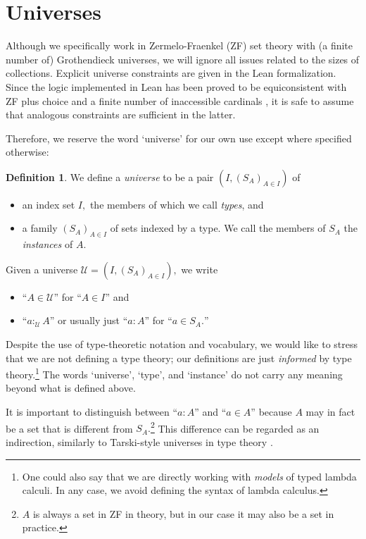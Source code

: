 \documentclass[a4paper]{article}
\theoremstyle{definition}
\newtheorem{definition}{Definition}[section]
\theoremstyle{remark}
\newcommand{\defn}{\emph}
\newcommand{\U}{\mathcal{U}}
\begin{document}
\section{Universes}
\label{sec:universes}

Although we specifically work in Zermelo-Fraenkel (ZF) set theory with (a finite number of)
Grothendieck universes, we will ignore all issues related to the sizes of collections.
Explicit universe constraints are given in the Lean formalization. Since the logic
implemented in Lean has been proved to be equiconsistent with ZF plus choice and a finite
number of inaccessible cardinals \cite{lean-type-theory}, it is safe to assume that analogous
constraints are sufficient in the latter.

Therefore, we reserve the word `universe' for our own use except where specified otherwise:

\begin{definition}
  We define a \defn{universe} to be a pair $(I, (S_A)_{A \in I})$ of
  \begin{itemize}
    \item an index set $I,$ the members of which we call \defn{types}, and
    \item a family $(S_A)_{A \in I}$ of sets indexed by a type. We call the members of $S_A$ the
    \defn{instances} of $A.$
  \end{itemize}
\end{definition}

Given a universe $\U = (I, (S_A)_{A \in I}),$ we write
\begin{itemize}
  \item ``$A \in \U$'' for ``$A \in I$'' and
  \item ``$a :_\U A$'' or usually just ``$a : A$'' for ``$a \in S_A.$''
\end{itemize}

Despite the use of type-theoretic notation and vocabulary, we would like to stress that we are not
defining a type theory; our definitions are just \emph{informed} by type theory.\footnote{One
could also say that we are directly working with \emph{models} of typed lambda calculi. In any case,
we avoid defining the syntax of lambda calculus.}
The words `universe', `type', and `instance' do not carry any meaning beyond what is defined above.

It is important to distinguish between ``$a : A$'' and ``$a \in A$'' because $A$ may in fact be a
set that is different from $S_A.$\footnote{$A$ is always a set in ZF in theory, but in our case it
may also be a set in practice.} This difference can be regarded as an indirection, similarly to
Tarski-style universes in type theory \cite{tarski}.
\end{document}
